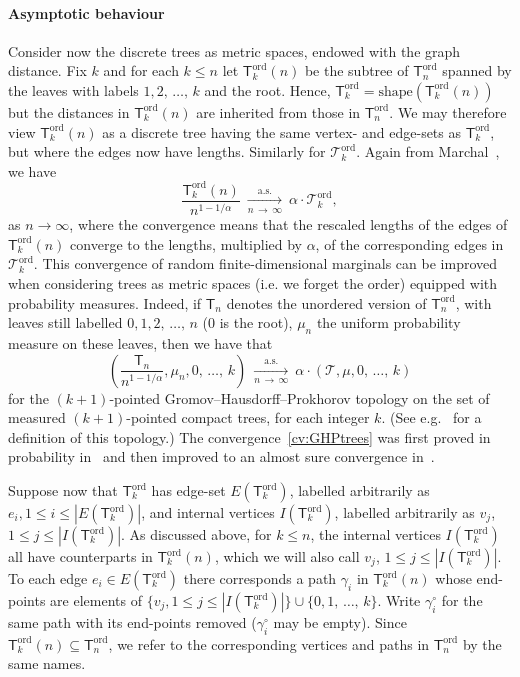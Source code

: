 \documentclass[10pt]{amsart}
\theoremstyle{definition}\newtheorem{defi}[theo]{Definition}\newtheorem{rema}[theo]{Remark}\newtheorem{exam}[theo]{Example}\newtheorem{exem}[theo]{Example}\newtheorem{nota}[theo]{Notation}
\renewcommand{\subset}{\subseteq}
\newcommand{\ord}{\mathrm{ord}}
\newcommand{\shape}{\mathrm{shape}}
\newcommand{\cT}{\mathcal{T}}
\newcommand{\sT}{\mathsf{T}}
\begin{document}
\paragraph{Asymptotic behaviour} 
Consider now the discrete trees as metric spaces, endowed with the graph distance. Fix $k$ and for each $k \leq n$ let $\sT^{\ord}_{k}(n)$ be the subtree of $\sT^{\ord}_n$ spanned by the leaves with labels $1,2,\,\ldots,\,k$ and the root. Hence, $\sT^{\ord}_k=\shape(\sT^{\ord}_{k}(n))$ but the distances in $\sT^{\ord}_{k}(n)$ are inherited from those in $\sT^{\ord}_n$. We may therefore view $\sT^{\ord}_{k}(n)$ as a discrete tree having the same vertex- and edge-sets as $\sT^{\ord}_k$, but where the edges now have lengths. Similarly for $\cT_k^{\ord}$. Again from Marchal~\cite{Marchal}, we have
\begin{equation}\label{cv:fdtrees}
\frac{\sT^{\ord}_{k}(n)}{n^{1-1/\alpha}} \ \underset{n\,\rightarrow\,\infty}{\overset{\text{a.s.}} \longrightarrow} \ \alpha \cdot \cT^{\ord}_k,
\end{equation}
as $n \to \infty$, where the convergence means that the rescaled lengths of the edges of $\sT^{\ord}_{k}(n)$ converge to the lengths, multiplied by $\alpha$, of the corresponding edges in $\cT^{\ord}_k$. This convergence of random finite-dimensional marginals can be improved when considering trees as metric spaces (i.e. we forget the order) equipped with probability measures. Indeed, if $\sT_n$ denotes the unordered version of $\sT^{\ord}_{n}$, with leaves still labelled $0,1,2,\,\ldots,\,n$ ($0$ is the root), $\mu_n$ the uniform probability measure on these leaves, then we have that
\begin{equation}\label{cv:GHPtrees}
\left(\frac{\sT_n}{n^{1-1/\alpha}}, \mu_n,0,\,\ldots,\,k\right) \ \underset{n\,\rightarrow\,\infty}{\overset{\text{a.s.}} \longrightarrow} \ \alpha \cdot \left(\cT,\mu, 0,\,\ldots,\,k\right)
\end{equation}
for the $(k+1)$-pointed Gromov--Hausdorff--Prokhorov topology on the set of measured $(k+1)$-pointed compact trees, for each integer $k$. (See e.g.~\cite[Section~6.4]{MiermontTessellations} for a definition of this topology.) The convergence~\eqref{cv:GHPtrees} was first proved in probability in~\cite[Corollary~24]{HMPW} and then improved to an almost sure convergence in~\cite[Section~2.4]{CurienHaas}.

Suppose now that $\sT^{\ord}_k$ has edge-set $E(\sT^{\ord}_k)$, labelled arbitrarily as $e_i,1 \leq i\leq |E(\sT^{\ord}_k)|$, and internal vertices $I(\sT^{\ord}_k)$, labelled arbitrarily as $v_j$, $1 \leq j \leq |I(\sT^{\ord}_k)|$. As discussed above, for $k \le n$, the internal vertices $I(\sT^{\ord}_k)$ all have counterparts in $\sT^{\ord}_{k}(n)$, which we will also call $v_j$, $1 \leq j \leq |I(\sT^{\ord}_k)|$. To each edge $e_i \in E(\sT^{\ord}_k)$ there corresponds a path $\gamma_i$ in $\sT^{\ord}_{k}(n)$ whose end-points are elements of $\{v_j, 1 \le j \le |I(\sT^{\ord}_k)|\} \cup \{0,1,\,\ldots,\,k\}$. Write $\gamma_i^{\circ}$ for the same path with its end-points removed ($\gamma_i^{\circ}$ may be empty). Since $\sT^{\ord}_{k}(n) \subset \sT^{\ord}_n$, we refer to the corresponding vertices and paths in $\sT^{\ord}_n$ by the same names.
\end{document}
